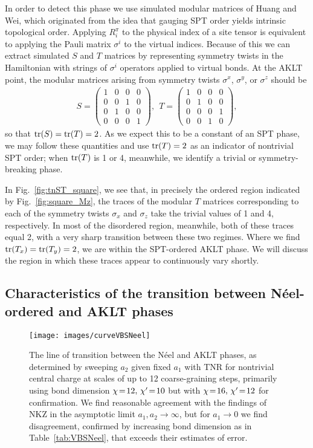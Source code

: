 \documentclass[aps,prb,letterpaper,superscriptaddress,twocolumn,showpacs,floatfix,10pt]{revtex4-1}
\begin{document}
In order to detect this phase we use simulated modular matrices of
Huang and Wei\cite{tnST,HungWenSPT}, which originated from the idea that
gauging SPT order yields intrinsic topological order\cite{LevinGuSPT}.
Applying $R^\pi_i$ to the physical index of a site tensor
is equivalent to applying the Pauli matrix $\sigma^i$ to the virtual indices.
Because of this we can extract simulated $S$ and $T$ matrices by
representing symmetry twists in the Hamiltonian with strings of $\sigma^i$
operators applied to virtual bonds. At the AKLT point, the modular matrices
arising from symmetry twists $\sigma^x$, $\sigma^y$, or $\sigma^z$ should be
\begin{align}
  \label{nontri_oZ2}
  S =  \begin{pmatrix}
    1 & 0&0 &0 \\
    0& 0&1 &0 \\
     0 & 1&0 &0\\
     0 & 0&0 &1
 \end{pmatrix},  \ \
 T =  \begin{pmatrix}
  1 & 0&0 &0 \\
  0& 1&0 &0 \\
   0 & 0&0 &1\\
   0 & 0&1 &0
 \end{pmatrix}, 
\end{align}
so that $\operatorname{tr}(S) = \operatorname{tr}(T) = 2$. As we expect this to be a constant
of an SPT phase, we may follow these quantities and use
$\operatorname{tr}(T) = 2$ as an indicator of nontrivial SPT order; when $\operatorname{tr}(T)$
is 1 or 4, meanwhile, we identify a trivial or symmetry-breaking phase.

In Fig.~\ref{fig:tnST_square}, we see that, in precisely the ordered region
indicated by Fig.~\ref{fig:square_Mz}, the traces of the
modular $T$ matrices corresponding to each of the symmetry twists
$\sigma_x$ and $\sigma_z$ take the trivial values of 1 and 4,
respectively. In most of the disordered region, meanwhile, both of these
traces equal 2, with a very sharp transition between these two regimes. Where
we find $\operatorname{tr}(T_x) = \operatorname{tr}(T_y) = 2$, we are within the SPT-ordered
AKLT phase. We will discuss the region in which these traces appear to
continuously vary shortly.
\subsection{Characteristics of the transition between N\'eel-ordered and AKLT phases}

\begin{figure}[h!]
\texttt{[image: images/curveVBSNeel]}
\caption{The line of transition between the N\'eel and AKLT phases, as
determined by sweeping $a_2$ given fixed $a_1$ with TNR for nontrivial
central charge at scales of up to 12 coarse-graining steps, primarily using
bond dimension $\chi\nobreak\!=\nobreak\!12, \,\chi'\nobreak\!=\nobreak\!10$ but with $\chi\nobreak\!=\nobreak\!16, \,\chi'\nobreak\!=\nobreak\!12$ for confirmation.
We find reasonable agreement with the findings of NKZ in the asymptotic limit
$a_1,a_2\to \infty$, but for $a_1\to 0$ we find disagreement, confirmed by
increasing bond dimension as in Table~\ref{tab:VBSNeel}, that exceeds their
estimates of error.}
\label{fig:curveVBSNeel}
\end{figure}
\end{document}
